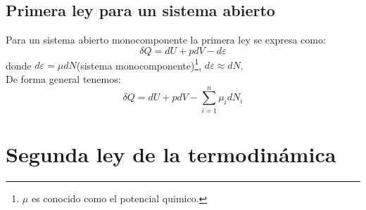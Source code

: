 \documentclass[../main]{subfiles}
\begin{document}
\section{Primera ley para un sistema abierto}
Para un sistema abierto monocomponente la primera ley se expresa como:
\begin{equation}
    \delta Q=dU+pdV-d \varepsilon
\end{equation}
donde $d \varepsilon= \mu dN$(sistema monocomponente)\footnote{$\mu$ es conocido como el potencial quimico.}, $d \varepsilon \approx dN$. \\
De forma general tenemos:
\begin{equation}
    \delta Q = dU+pdV-\sum_{i=1}^n \mu_i dN_i
\end{equation}
\chapter{Segunda ley de la termodinámica}
\end{document}
